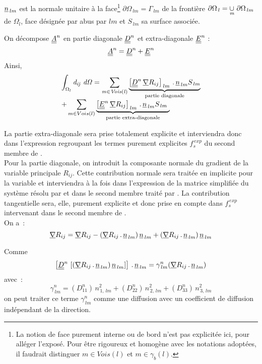 $\underline{n}_{\,lm}$ est la normale unitaire à la face\footnote{La notion de
face purement interne ou de bord n'est pas explicitée ici, pour alléger l'exposé. Pour être rigoureux et homogène avec les notations
adoptées, il faudrait distinguer $ m\in {Vois(l)} $ et $ m\in {\gamma_b(l)}$.}
$ \partial \Omega_{\,lm} = \Gamma_{\,lm}$ de la frontière
 $\partial \Omega_{\,l} = \underset{\text{\it m}}{\cup}\ \partial
\Omega_{\,lm}$ de $\Omega_l$, face désignée par abus par $lm$ et $S_{\,lm}$ sa surface associée.

On décompose $\underline{\underline{A}}^n$ en partie diagonale $\underline{\underline{D}}^n$ et
extra-diagonale $\underline{\underline{E}}^n$ :\\
$$\underline{\underline{A}}^n =\underline{\underline{D}}^n + \underline{\underline{E}}^n$$
Ainsi,
\begin{equation}
\begin{array}{l}
\displaystyle \int_{\Omega_l} \it{d}_{ij}\ d\Omega =
\sum\limits_{m\in
Vois(l)} \underbrace{ \left[
\underline{\underline{D}}^n\,\underline{\nabla}{R}_{ij}\right]_{\,lm}\,.\,\underline{n}_{\,lm}S_{\,lm} }
_{\text {partie diagonale}}\\
+ \displaystyle\sum\limits_{m\in
Vois(l)} \underbrace{ \left[
\underline{\underline{E}}^n\,\underline{\nabla}{R}_{ij} \right]_{\,lm}\,.\,\underline{n}_{\,lm}S_{\,lm}\ }
_{\text {partie extra-diagonale}}
\end{array}
\end{equation}

La partie extra-diagonale sera prise totalement explicite et interviendra donc
dans l'expression regroupant les termes purement explicites $f_s^{\,exp}$ du
second membre de .\\
Pour la partie diagonale, on introduit la composante normale du gradient de la
variable principale $R_{ij}$. Cette  contribution normale sera traitée en
implicite pour la variable et interviendra à la fois dans l'expression de la matrice simplifiée du système résolu par  et dans
le second membre traité par . La
contribution tangentielle sera, elle, purement explicite et donc prise en compte
dans $f_s^{\,exp}$ intervenant dans le second membre de .\\
On a~:
\begin{equation}
\displaystyle
\underline{\nabla}{R}_{ij}  = \underline{\nabla}{R}_{ij} - (\underline{\nabla}{R}_{ij}\,.\,\underline{n}_{\,lm})\,\underline{n}_{\,lm} + (\underline{\nabla}{R}_{ij}\,.\,\underline{n}_{\,lm})\,\underline{n}_{\,lm}
\end{equation}

Comme $$\left[ \underline{\underline{D}}^n\,\left[ (\underline{\nabla}{R}_{ij}\,.\,\underline{n}_{\,lm})\,\underline{n}_{\,lm}
\right] \right]\,.\,\underline{n}_{\,lm}  = \gamma^n_{\,lm} (\underline{\nabla}{R}_{ij}\,.\,\underline{n}_{\,lm})$$
 avec~:
$$\gamma^n_{\,lm} = (D^n_{11})\,n^2_{\,1,\,lm} + (D^n_{22})\,n^2_{\,2,\,lm} +
(D^n_{33})\,n^2_{\,3,\,lm}$$
 on peut traiter ce terme $\gamma^n_{\,lm}$ comme une diffusion avec un
coefficient de diffusion indépendant de la direction.\\

